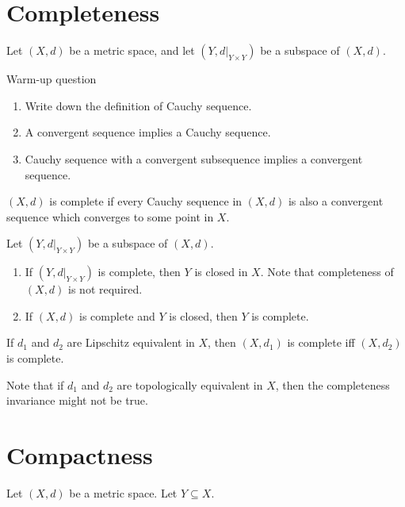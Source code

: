 \documentclass[12pt]{article}
\begin{document}
\section{Completeness}
Let $(X,d)$ be a metric space, and let $(Y,d|_{Y\times Y})$ be a subspace of $(X,d)$.

\begin{bbox}
 \begin{exercise}
    Warm-up question
    \begin{enumerate}
        \item Write down the definition of Cauchy sequence.
        \item A convergent sequence implies a Cauchy sequence.
        \item Cauchy sequence with a convergent subsequence implies a convergent sequence.
    \end{enumerate}
 \end{exercise}
\end{bbox}


\begin{definition}
$(X,d)$ is complete if every Cauchy sequence in $(X,d)$ is also a convergent sequence which converges to some point in \textbf{$X$}.
\end{definition}

\begin{theorem}
    Let $(Y,d|_{Y\times Y})$ be a subspace of $(X,d)$.
    \begin{enumerate}
        \item If $(Y,d|_{Y\times Y})$ is complete, then $Y$ is closed in $X$. Note that completeness of $(X,d)$ is not required.
        \item If $(X,d)$ is complete and $Y$ is closed, then $Y$ is complete.
    \end{enumerate}
\end{theorem}


\begin{theorem}
    If $d_1$ and $d_2$ are Lipschitz equivalent in $X$, then $(X,d_1)$ is complete iff $(X,d_2)$ is complete.
\end{theorem}

\begin{remark}
    Note that if $d_1$ and $d_2$ are topologically equivalent in $X$, then the completeness invariance might not be true.
\end{remark}


\section{Compactness}
Let $(X,d)$ be a metric space. Let $Y\subseteq X$.
\end{document}
